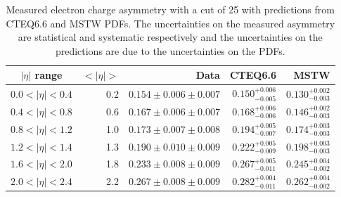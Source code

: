 \begin{table}[htbp]
\begin{center}
\begin{tabular}{crrrr}
    \toprule
$|\eta|$ range & $<|\eta|>$ & Data & CTEQ6.6 & MSTW \\
\midrule 
$0.0<|\eta|<0.4$ & 0.2 & $0.154\pm0.006\pm0.007$ & $0.150^{+0.006}_{-0.005}$ & $0.130^{+0.002}_{-0.003}$\\
$0.4<|\eta|<0.8$ & 0.6 & $0.167\pm0.006\pm0.007$ & $0.168^{+0.006}_{-0.006}$ & $0.146^{+0.002}_{-0.003}$\\
$0.8<|\eta|<1.2$ & 1.0 & $0.173\pm0.007\pm0.008$ & $0.194^{+0.005}_{-0.007}$ & $0.174^{+0.003}_{-0.003}$\\
$1.2<|\eta|<1.4$ & 1.3 & $0.190\pm0.010\pm0.009$ & $0.222^{+0.005}_{-0.009}$ & $0.198^{+0.003}_{-0.003}$\\
$1.6<|\eta|<2.0$ & 1.8 & $0.233\pm0.008\pm0.009$ & $0.267^{+0.005}_{-0.011}$ & $0.245^{+0.004}_{-0.002}$\\
$2.0<|\eta|<2.4$ & 2.2 & $0.267\pm0.008\pm0.009$ & $0.282^{+0.004}_{-0.011}$ & $0.262^{+0.004}_{-0.002}$\\
    \bottomrule
\end{tabular}
\caption[Measured electron charge asymmetry with a \pT cut of \unit{25}{\GeV}]
{Measured electron charge asymmetry with a \pT cut of \unit{25}{\GeV} with
predictions from CTEQ6.6 and MSTW PDFs.  The uncertainties on the measured
asymmetry are statistical and systematic respectively and the uncertainties on
the predictions are due to the uncertainties on the PDFs\cite{baisini2010electron}.}
\label{tab:results25}
\end{center}
\end{table}


